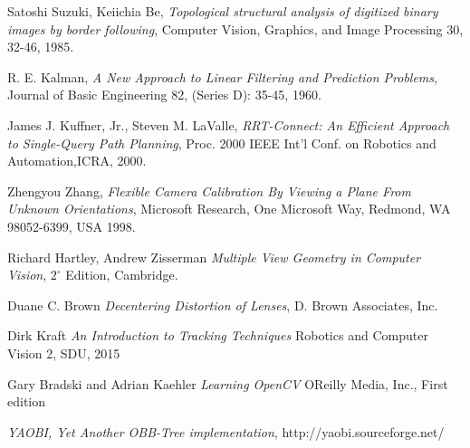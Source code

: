 \begin{thebibliography}{9}

	Satoshi Suzuki, Keiichia Be,
	\emph{Topological structural analysis of digitized binary images by border following},
	Computer Vision, Graphics, and Image Processing 30, 32-46,
	1985.
	
	R. E. Kalman,
	\emph{A New Approach to Linear Filtering and Prediction Problems},
	Journal of Basic Engineering 82, (Series D): 35-45,
	1960.

	James J. Kuffner, Jr., Steven M. LaValle,
	\emph{RRT-Connect: An Efficient Approach to Single-Query Path Planning},
	Proc. 2000 IEEE Int’l Conf. on Robotics and Automation,ICRA, 2000.

	Zhengyou Zhang,
	\emph{Flexible Camera Calibration By Viewing a Plane From Unknown Orientations},
	Microsoft Research, One Microsoft Way, Redmond, WA 98052-6399, USA
	1998.

	Richard Hartley, Andrew Zisserman
	\emph{Multiple View Geometry in Computer Vision},
	$2^{\circ}$ Edition, Cambridge.

	Duane C. Brown
	\emph{Decentering Distortion of Lenses},
	D. Brown Associates, Inc.

	Dirk Kraft
	\emph{An Introduction to Tracking Techniques}
	Robotics and Computer Vision 2, SDU, 2015

	Gary Bradski and Adrian Kaehler
	\emph{Learning OpenCV}
	OReilly Media, Inc., First edition

	\emph{YAOBI, Yet Another OBB-Tree implementation},
	http://yaobi.sourceforge.net/

\end{thebibliography}